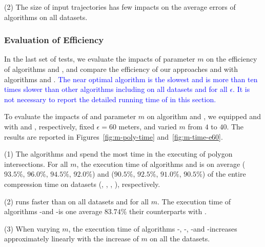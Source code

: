 \ni(2) The size of input trajectories has few impacts on the average errors of \lsa algorithms on all datasets.





\subsubsection{Evaluation of Efficiency}

In the last set of tests, we evaluate the impacts of parameter $m$ on the efficiency of algorithms \cist and \cista, and compare the efficiency of our approaches \cist and \cista with algorithms \dps and \squishe.
\textcolor{blue}{The near optimal algorithm \cisto is the slowest and is more than ten times slower than other algorithms including \dpa on all datasets and for all $\epsilon$. It is not necessary to report the detailed running time of \cisto in this section.}
%

To evaluate the impacts of \rpia and parameter $m$ on algorithm \cist and \cista, we
equipped \cist and \cista with \rpia and \cpia, respectively, fixed $\epsilon =60$ meters, and varied $m$ from $4$ to $40$.
%
The results are reported in Figures~\ref{fig:m-poly-time} and~\ref{fig:m-time-e60}.

\ni(1) The algorithms \cist and \cista spend the most time in the executing of
polygon intersections. For all $m$, the execution time of algorithms \cpia and
\rpia is on average {($93.5\%$, $96.0\%$, $94.5\%$, $92.0\%$)
	and ($90.5\%$, $92.5\%$, $91.0\%$, $90.5\%$)} of the entire compression  time on {datasets}
(\sercar, \geolife, \mopsi,  \pricar), respectively.

\ni(2) \rpia runs faster than \cpia on all datasets and for all $m$. The execution time of algorithms \cist-\rpia and \cista-\rpia is one average $83.74\%$ their counterparts with \cpia.

\ni(3) When varying $m$, the execution time of algorithms \cist-\rpia, \cist-\cpia, \cista-\rpia and \cista-\cpia increases approximately linearly with the increase of $m$ on all the datasets.

